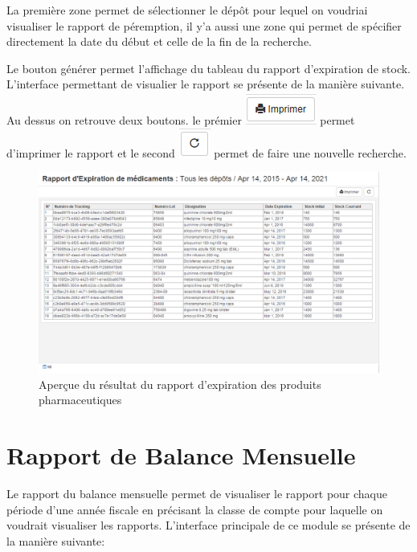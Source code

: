 \documentclass[12pt,a4paper]{report}
\begin{document}
La première zone permet de sélectionner le dépôt pour lequel on voudriai visualiser le rapport de péremption, il y'a aussi une zone qui permet de spécifier directement la date du début et celle de la fin de la recherche. 

Le bouton générer permet l'affichage du tableau du rapport d'expiration de stock. L'interface permettant de visualier le rapport se présente de la manière suivante. Au dessus on retrouve deux boutons. le prémier 
\includegraphics[scale=0.7]{pic/Print.png} permet d'imprimer le rapport et le second \includegraphics[scale=0.7]{pic/refresh.png} permet de faire une nouvelle recherche.

\begin{figure}[h]
\begin{center}
\includegraphics[width=12cm]{pic/AppRapExMedi.png}
\end{center}
\caption{Aperçue du résultat du rapport d'expiration des produits pharmaceutiques}
\label{Aperçue du résultat du rapport d'expiration des produits pharmaceutiques}
\end{figure}

\newpage
\section{Rapport de Balance Mensuelle}
Le rapport du balance mensuelle permet de visualiser le rapport pour chaque période d'une année fiscale en précisant la classe de compte pour laquelle on voudrait visualiser les rapports.
L'interface principale de ce module se présente de la manière suivante:
\end{document}

